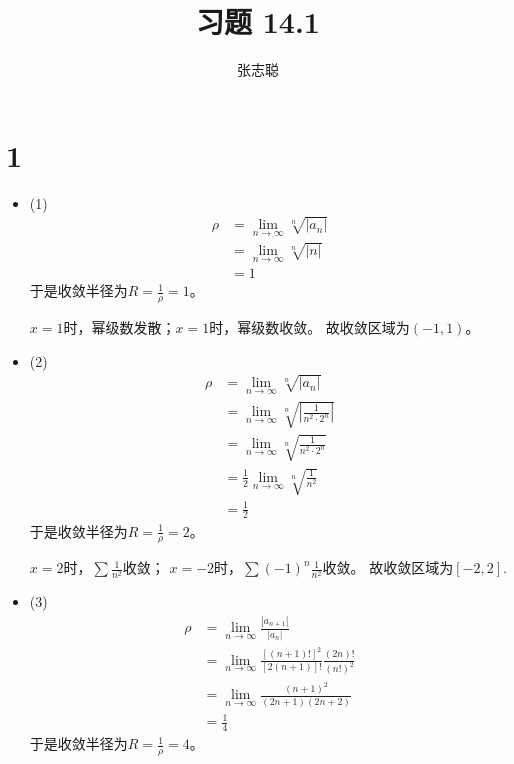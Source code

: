 \documentclass{article}
\begin{document}
\title{习题 14.1}
\author{张志聪}
\maketitle

\section*{1}
\begin{itemize}
  \item (1)
        \begin{align*}
          \rho
           & = \lim\limits_{n\to\infty} \sqrt[n]{|a_n|} \\
           & = \lim\limits_{n\to\infty} \sqrt[n]{|n|}   \\
           & = 1
        \end{align*}
        于是收敛半径为$R = \frac{1}{\rho} = 1$。

        $x = 1$时，幂级数发散；$x = 1$时，幂级数收敛。
        故收敛区域为$(-1, 1)$。
  \item (2)
        \begin{align*}
          \rho
           & = \lim\limits_{n\to\infty} \sqrt[n]{|a_n|}                     \\
           & = \lim\limits_{n\to\infty} \sqrt[n]{|\frac{1}{n^2\cdot 2^n}|}  \\
           & = \lim\limits_{n\to\infty} \sqrt[n]{\frac{1}{n^2\cdot 2^n}}    \\
           & = \frac{1}{2} \lim\limits_{n\to\infty} \sqrt[n]{\frac{1}{n^2}} \\
           & = \frac{1}{2}
        \end{align*}
        于是收敛半径为$R = \frac{1}{\rho} = 2$。

        $x = 2$时，$\sum \frac{1}{n^2}$收敛；
        $x = -2$时，$\sum (-1)^n \frac{1}{n^2}$收敛。
        故收敛区域为$[-2, 2]$.

  \item (3)
        \begin{align*}
          \rho
           & = \lim\limits_{n\to\infty} \frac{|a_{n + 1}|}{|a_n|}                             \\
           & = \lim\limits_{n\to\infty} \frac{[(n + 1)!]^2}{[2(n + 1)]!} \frac{(2n)!}{(n!)^2} \\
           & = \lim\limits_{n\to\infty} \frac{(n + 1)^2}{(2n + 1)(2n + 2)}                    \\
           & = \frac{1}{4}
        \end{align*}
        于是收敛半径为$R = \frac{1}{\rho} = 4$。


\end{itemize}
\end{document}
